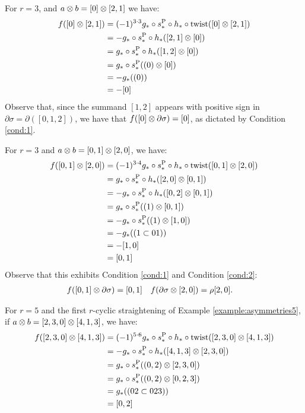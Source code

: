 \begin{example}\label{example:f3_1}
	For $r=3$, and $a \otimes b = [0] \otimes [2,1]$ we have:
	\begin{align*}
		f([0] \otimes [2,1])
		&= (-1)^{3\cdot 3}g_*\circ s_*^{\operatorname{P}}\circ h_*\circ \operatorname{twist}([0] \otimes [2,1])
		\\
		&= -g_*\circ s_*^{\operatorname{P}}\circ h_*([2,1] \otimes [0])
		\\
		&= g_*\circ s_*^{\operatorname{P}}\circ h_*([1,2] \otimes [0])
		\\
		&= g_*\circ s_*^{\operatorname{P}}((0) \otimes [0])
		\\
		&= -g_*((0))
		\\
		&= -[0]
	\end{align*}
	Observe that, since the summand $[1,2]$ appears with positive sign in $\partial \sigma = \partial([0,1,2])$, we have that $f([0] \otimes \partial\sigma) = [0]$, as dictated by Condition \eqref{cond:1}.
\end{example}

\begin{example}\label{example:f3_2}
	For $r=3$ and $a \otimes b = [0,1] \otimes [2,0]$, we have:
	\begin{align*}
		f([0,1] \otimes [2,0]) &= (-1)^{3\cdot 4}g_*\circ s_*^{\operatorname{P}}\circ h_*\circ \operatorname{twist}([0,1] \otimes [2,0])
		\\
		&= g_*\circ s_*^{\operatorname{P}}\circ h_*([2,0] \otimes [0,1])
		\\
		&= -g_*\circ s_*^{\operatorname{P}}\circ h_*([0,2] \otimes [0,1])
		\\
		&= g_*\circ s_*^{\operatorname{P}}((1) \otimes [0,1])
		\\
		&= -g_*\circ s_*^{\operatorname{P}}((1) \otimes [1,0])
		\\
		&= -g_*((1 \subset 01))
		\\
		&= -[1,0]
		\\
		&= [0,1]
	\end{align*}
	Observe that this exhibits Condition \eqref{cond:1} and Condition \eqref{cond:2}:
	\begin{align*}
		f([0,1] \otimes \partial\sigma) &= [0,1]
		&
		f(\partial\sigma \otimes [2,0]) &= \rho[2,0].
	\end{align*}
\end{example}

\begin{example}\label{example:f5_1}
	For $r=5$ and the first $r$-cyclic straightening of Example \ref{example:asymmetries5}, if $a \otimes b = [2,3,0] \otimes [4,1,3]$, we have:
	\begin{align*}
		f([2,3,0] \otimes [4,1,3]) &= (-1)^{5\cdot 6}g_*\circ s_*^{\operatorname{P}}\circ h_*\circ \operatorname{twist}([2,3,0] \otimes [4,1,3])
		\\
		&= -g_*\circ s_*^{\operatorname{P}}\circ h_*([4,1,3] \otimes [2,3,0])
		\\
		&= g_*\circ s_*^{\operatorname{P}}((0,2) \otimes [2,3,0])
		\\
		&= g_*\circ s_*^{\operatorname{P}}((0,2) \otimes [0,2,3])
		\\
		&= g_*((02 \subset 023))
		\\
		&= [0,2]
	\end{align*}
\end{example}

